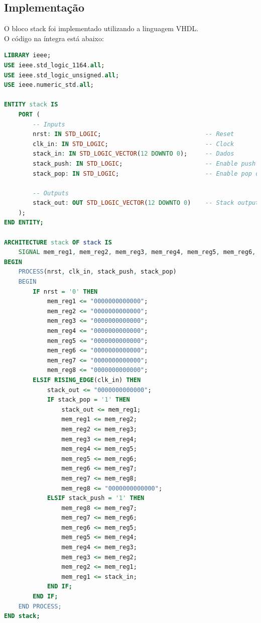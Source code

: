 \documentclass{article}
\begin{document}
\subsection{Implementação}

O bloco stack foi implementado utilizando a linguagem VHDL.\\

O código na íntegra está abaixo:\\

\begin{lstlisting}[language=VHDL, caption={Código VHDL status\_reg}]
LIBRARY ieee;
USE ieee.std_logic_1164.all;
USE ieee.std_logic_unsigned.all;
USE ieee.numeric_std.all;

ENTITY stack IS
    PORT (
        -- Inputs
        nrst: IN STD_LOGIC;                             -- Reset
        clk_in: IN STD_LOGIC;                           -- Clock
        stack_in: IN STD_LOGIC_VECTOR(12 DOWNTO 0);     -- Dados
        stack_push: IN STD_LOGIC;                       -- Enable push op
        stack_pop: IN STD_LOGIC;                        -- Enable pop op
        
        -- Outputs
        stack_out: OUT STD_LOGIC_VECTOR(12 DOWNTO 0)    -- Stack output
    );
END ENTITY;

ARCHITECTURE stack OF stack IS
    SIGNAL mem_reg1, mem_reg2, mem_reg3, mem_reg4, mem_reg5, mem_reg6, mem_reg7, mem_reg8 : STD_LOGIC_VECTOR(12 DOWNTO 0);
BEGIN
    PROCESS(nrst, clk_in, stack_push, stack_pop)
    BEGIN
        IF nrst = '0' THEN
            mem_reg1 <= "0000000000000";
            mem_reg2 <= "0000000000000";
            mem_reg3 <= "0000000000000";
            mem_reg4 <= "0000000000000";
            mem_reg5 <= "0000000000000";
            mem_reg6 <= "0000000000000";
            mem_reg7 <= "0000000000000";
            mem_reg8 <= "0000000000000";
        ELSIF RISING_EDGE(clk_in) THEN
			stack_out <= "0000000000000";
            IF stack_pop = '1' THEN
                stack_out <= mem_reg1;
                mem_reg1 <= mem_reg2;
                mem_reg2 <= mem_reg3;
                mem_reg3 <= mem_reg4;
                mem_reg4 <= mem_reg5;
                mem_reg5 <= mem_reg6;
                mem_reg6 <= mem_reg7;
                mem_reg7 <= mem_reg8;
                mem_reg8 <= "0000000000000";
            ELSIF stack_push = '1' THEN
                mem_reg8 <= mem_reg7;
                mem_reg7 <= mem_reg6;
                mem_reg6 <= mem_reg5;
                mem_reg5 <= mem_reg4;
                mem_reg4 <= mem_reg3;
                mem_reg3 <= mem_reg2;
                mem_reg2 <= mem_reg1;
                mem_reg1 <= stack_in; 
            END IF;
        END IF;
    END PROCESS;
END stack;
\end{lstlisting}
\end{document}
